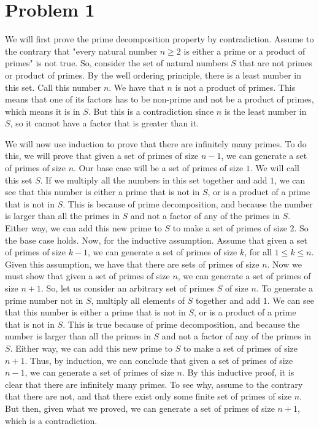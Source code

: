 \documentclass{article}
\begin{document}
\section*{Problem 1}
We will first prove the prime decomposition property by contradiction.
Assume to the contrary that "every natural number $n \geq 2$ is either a prime or
a product of primes" is not true. So, consider the set of natural numbers $S$
that are not primes or product of primes. By the well ordering principle,
there is a least number in this set. Call this number $n$. We have that $n$
is not a product of primes. This means that one of its factors has to be
non-prime and not be a product of primes, which means it is in $S$. But this
is a contradiction since $n$ is the least number in $S$, so it cannot have
a factor that is greater than it.

We will now use induction to prove that there are infinitely many primes.
To do this, we will prove that given a set of primes of size $n-1$, we can generate
a set of primes of size $n$.
Our base case will be a set of primes of size $1$. We will call this set
$S$. If we multiply all the numbers
in this set together and add $1$, we can see that this number is either a prime
that is not in $S$, or is a product of a prime that is not in $S$.
This is because of prime decomposition, and because the number is larger
than all the primes in $S$ and not a factor of any of the primes in $S$. Either way,
we can add this new prime to $S$ to make a set of primes of size $2$. So the base
case holds. Now, for the inductive assumption. Assume that given a set of
primes of size $k-1$, we can generate a set of primes of size $k$,
for all $1 \leq k \leq n$. Given this assumption, we have that there are sets of primes
of size $n$. Now we must show that given a set of primes of size $n$, we can
generate a set of primes of size $n+1$. So, let us consider an arbitrary set of
primes $S$ of size $n$. To generate a prime number not in $S$, multiply all
elements of $S$ together and add $1$. We can see that this number is either a
prime that is not in $S$, or is a product of a prime that is not in $S$. This
is true because of prime decomposition, and because the number is larger than
all the primes in $S$ and not a factor of any of the primes in $S$. Either way,
we can add this new prime to $S$ to make a set of primes of size $n+1$.
Thus, by induction, we can conclude that given a set of primes of size $n-1$, we
can generate a set of primes of size $n$. By this inductive proof, it is clear
that there are infinitely many primes. To see why, assume to the contrary that there
are not, and that there exist only some finite set of primes of size $n$. But then,
given what we proved, we can generate a set of primes of size $n+1$, which is
a contradiction.
\end{document}
